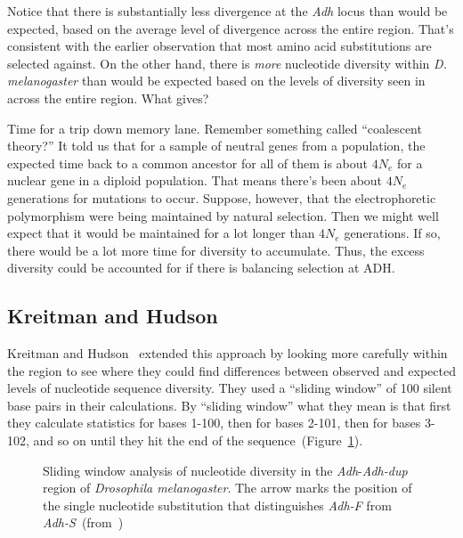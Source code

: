 \documentclass[12pt]{article}
\begin{document}
Notice that there is substantially less divergence at the {\it Adh\/}
locus than would be expected, based on the average level of divergence
across the entire region. That's consistent with the earlier
observation that most amino acid substitutions are selected
against. On the other hand, there is {\it more\/} nucleotide diversity
within {\it D. melanogaster\/} than would be expected based on the
levels of diversity seen in across the entire region. What gives?

Time for a trip down memory lane. Remember something called
``coalescent theory?'' It told us that for a sample of neutral genes
from a population, the expected time back to a common ancestor for all
of them is about $4N_e$ for a nuclear gene in a diploid
population. That means there's been about $4N_e$ generations for
mutations to occur. Suppose, however, that the electrophoretic
polymorphism were being maintained by natural selection. Then we might
well expect that it would be maintained for a lot longer than $4N_e$
generations. If so, there would be a lot more time for diversity to
accumulate. Thus, the excess diversity could be accounted for if there
is balancing selection at ADH.

\subsection*{Kreitman and Hudson}

Kreitman and Hudson~\cite{Kreitman-Hudson91} extended this approach by
looking more carefully within the region to see where they could find
differences between observed and expected levels of nucleotide
sequence diversity. They used a ``sliding window'' of 100 silent base
pairs in their calculations. By ``sliding window'' what they mean is
that first they calculate statistics for bases 1-100, then for bases
2-101, then for bases 3-102, and so on until they hit the end of the
sequence~(Figure~\ref{fig:kh}). 

\begin{figure}
\begin{center}
\end{center}
\caption{Sliding window analysis of nucleotide diversity in the {\it
    Adh\/}-{\it Adh-dup} region of {\it Drosophila melanogaster}. The
  arrow marks the position of the single nucleotide substitution that
  distinguishes {\it Adh-F\/} from {\it
    Adh-S\/}~(from~\cite{Kreitman-Hudson91})}\label{fig:kh}
\end{figure}
\end{document}
